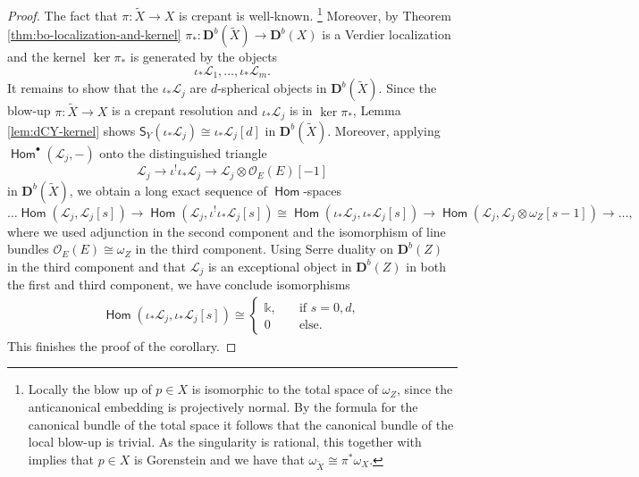 \documentclass[a4paper,11pt, reqno]{amsart}
\def\DD{\mathbf D}
\def\OO{\mathcal O}
\def\sL{\mathscr{L}}
\newcommand{\opname}[1]{\operatorname{\mathsf{#1}}}
\newcommand{\Hom}{\opname{Hom}}
\def\Db{\DD^b}
\newcommand{\bS}{\mathsf{S}}
\theoremstyle{plain}
\theoremstyle{definition}
\numberwithin{equation}{section}
\begin{document}
\begin{proof}
        The fact that $\pi\colon \tilde{X} \to X$ is crepant is well-known.
        \footnote{Locally the blow up of $p\in X$ is isomorphic to the total space of $\omega_Z$, since the anticanonical embedding is projectively normal.
        By the formula for the canonical bundle of the total space it follows that the canonical bundle of the local blow-up is trivial.
        As the singularity is rational, this together with \cite[Theorem 5.10]{kollar-mori} implies that $p\in X$ is Gorenstein and we have that $\omega_{\tilde{X}}\cong \pi^\ast \omega_X $.}\label{footnote5}
        Moreover, by Theorem \ref{thm:bo-localization-and-kernel} $\pi_\ast \colon \Db ( \tilde{X} ) \to \Db (X)$ is a Verdier localization and the kernel $\ker \pi_\ast$ is generated by the objects
        \[
        \iota_\ast\sL_1 , \ldots , \iota_\ast\sL_m .
        \]
        It remains to show that the $\iota_\ast \sL_j$ are $d$-spherical objects in $\Db(\tilde{X} )$.
    Since the blow-up $\pi : \tilde{X} \to X$ is a crepant resolution and $\iota_\ast\sL_j$ is in $\ker \pi_\ast$,  Lemma \ref{lem:dCY-kernel} shows $\bS_Y ( \iota_\ast \sL_j ) \cong \iota_\ast \sL_j [d]$ in $\Db ( \tilde{X} )$.
Moreover, 
applying $\Hom^\bullet (  \sL_j , - )$ onto the distinguished triangle 
\[
 \sL_j \to \iota^! \iota_\ast\sL_j \to \sL_j \otimes \OO_E(E)[-1]
\]
in $\Db( \tilde{X})$, we obtain a long exact sequence of 
$\Hom$-spaces
\[
\ldots \Hom ( \sL_j , \sL_j [s] ) \to \Hom ( \sL_j , \iota^! \iota_\ast \sL_j [s] ) \cong \Hom ( \iota_\ast\sL_j , \iota_\ast \sL_j [s] ) \to \Hom ( \sL_j , \sL_j \otimes \omega_Z [s-1] ) \to \ldots ,
\]
where we used adjunction in the second component and the isomorphism of line bundles $\OO_E (E) \cong \omega_Z$ in the third component.
Using Serre duality on $\Db(Z)$ in the third component  
and that $\sL_j$ is an exceptional object in $\Db(Z)$ in both the first and third component, we have conclude isomorphisms
\begin{align*}
\Hom (\iota_\ast\sL_j , \iota_\ast\sL_j [s] ) \cong  \begin{cases} \mathbb{k} , \quad & \text{if } s =   0 , d ,  \\ 
0 \quad & \text{else. }\end{cases}
\end{align*}
This finishes the proof of the corollary.
\end{proof}
\end{document}
